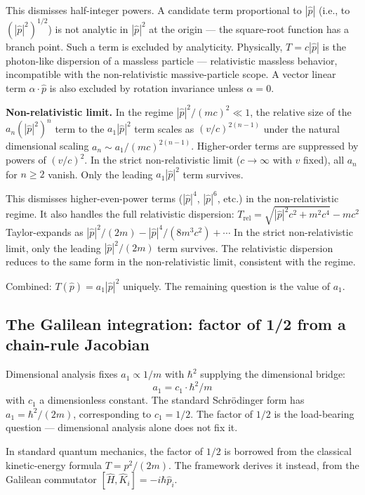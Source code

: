 \documentclass[11pt,a4paper]{article}
\begin{document}
This dismisses half-integer powers. A candidate term proportional to $|\hat{p}|$ (i.e., to $(|\hat{p}|^{2})^{1/2}$) is not analytic in $|\hat{p}|^{2}$ at the origin --- the square-root function has a branch point. Such a term is excluded by analyticity. Physically, $T = c|\hat{p}|$ is the photon-like dispersion of a massless particle --- relativistic massless behavior, incompatible with the non-relativistic massive-particle scope. A vector linear term $\alpha \cdot \hat{p}$ is also excluded by rotation invariance unless $\alpha = 0$.

\textbf{Non-relativistic limit.} In the regime $|\hat{p}|^{2}/(mc)^{2} \ll 1$, the relative size of the $a_n (|\hat{p}|^{2})^{n}$ term to the $a_1 |\hat{p}|^{2}$ term scales as $(v/c)^{2(n-1)}$ under the natural dimensional scaling $a_n \sim a_1 / (mc)^{2(n-1)}$. Higher-order terms are suppressed by powers of $(v/c)^{2}$. In the strict non-relativistic limit ($c \to \infty$ with $v$ fixed), all $a_n$ for $n \geq 2$ vanish. Only the leading $a_1 |\hat{p}|^{2}$ term survives.

This dismisses higher-even-power terms ($|\hat{p}|^{4}$, $|\hat{p}|^{6}$, etc.) in the non-relativistic regime. It also handles the full relativistic dispersion: $T_\mathrm{rel} = \sqrt{|\hat{p}|^{2}c^{2} + m^{2}c^{4}} - mc^{2}$ Taylor-expands as $|\hat{p}|^{2}/(2m) - |\hat{p}|^{4}/(8m^{3}c^{2}) + \cdots$ In the strict non-relativistic limit, only the leading $|\hat{p}|^{2}/(2m)$ term survives. The relativistic dispersion reduces to the same form in the non-relativistic limit, consistent with the regime.

Combined: $T(\hat{p}) = a_1 |\hat{p}|^{2}$ uniquely. The remaining question is the value of $a_1$.

\subsection{The Galilean integration: factor of 1/2 from a chain-rule Jacobian}

Dimensional analysis fixes $a_1 \propto 1/m$ with $\hbar^{2}$ supplying the dimensional bridge:
\[
a_1 = c_1 \cdot \hbar^{2} / m
\]
with $c_1$ a dimensionless constant. The standard Schr\"odinger form has $a_1 = \hbar^{2}/(2m)$, corresponding to $c_1 = 1/2$. The factor of $1/2$ is the load-bearing question --- dimensional analysis alone does not fix it.

In standard quantum mechanics, the factor of $1/2$ is borrowed from the classical kinetic-energy formula $T = p^{2}/(2m)$. The framework derives it instead, from the Galilean commutator $[\hat{H}, \hat{K}_i] = -i\hbar\hat{p}_i$.
\end{document}
